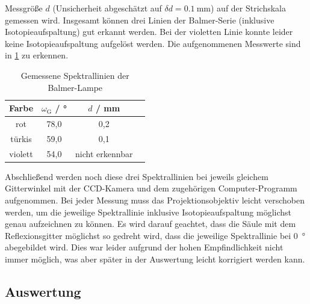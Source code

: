Messgröße $d$ (Unsicherheit abgeschätzt auf $\delta d = \SI{0,1}{\milli \meter}$) auf der Strichskala gemessen wird. Insgesamt können drei Linien der Balmer-Serie (inklusive Isotopieaufspaltung) gut erkannt werden. Bei der violetten Linie konnte leider keine Isotopieaufspaltung aufgelöst werden. Die aufgenommenen Messwerte sind in \cref{tab:spektrallinien_balmer}
zu erkennen.
\begin{table}[H]
    \centering
    \caption{Gemessene Spektrallinien der Balmer-Lampe}
    \begin{tabular}{c|c|c|c}
        Farbe & $\omega_{\mathrm{G}}$ / \unit{\degree} & $d$ / \unit{\milli \meter} \\
        \hline
        rot & 78,0 & 0,2 \\
        türkis & 59,0 & 0,1 \\
        violett & 54,0 & nicht erkennbar
    \end{tabular}\label{tab:spektrallinien_balmer}
\end{table} Abschließend werden noch diese drei Spektrallinien bei jeweils gleichem Gitterwinkel mit der CCD-Kamera und dem zugehörigen Computer-Programm aufgenommen.
Bei jeder Messung muss das Projektionsobjektiv leicht verschoben werden, um die jeweilige Spektrallinie inklusive Isotopieaufspaltung möglichst genau aufzeichnen zu können.
Es wird darauf geachtet, dass die Säule mit dem Reflexionsgitter möglichst so gedreht wird, dass die jeweilige Spektrallinie bei \SI{0}{\degree} abegebildet wird.
Dies war leider aufgrund der hohen Empfindlichkeit nicht immer möglich, was aber später in der Auswertung leicht korrigiert werden kann.

\subsection{Auswertung}\label{subsec:balmer_auswertung}
